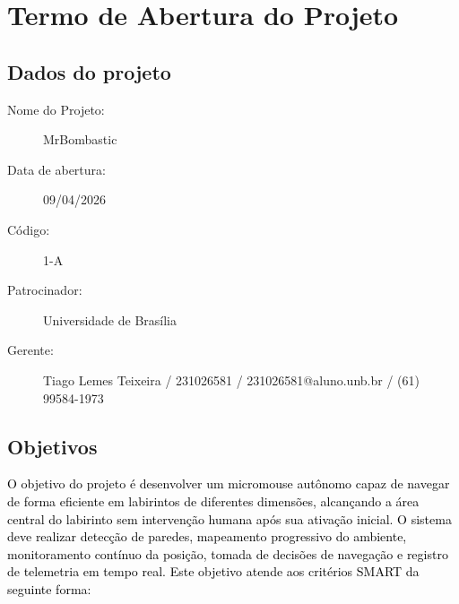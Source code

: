 \chapter{Termo de Abertura do Projeto}

\section{Dados do projeto}
\begin{description}
    \item [Nome do Projeto:] MrBombastic
    \item [Data de abertura:] 09/04/2026
    \item [Código:] 1-A
    \item [Patrocinador:] Universidade de Brasília
    \item [Gerente:] Tiago Lemes Teixeira / 231026581 / 231026581@aluno.unb.br / (61) 99584-1973
\end{description}

\section{Objetivos}

\textcolor{black}{
O objetivo do projeto é desenvolver um micromouse autônomo capaz de navegar de forma eficiente em labirintos de diferentes dimensões, alcançando a área central do labirinto sem intervenção humana após sua ativação inicial. O sistema deve realizar detecção de paredes, mapeamento progressivo do ambiente, monitoramento contínuo da posição, tomada de decisões de navegação e registro de telemetria em tempo real. Este objetivo atende aos critérios SMART da seguinte forma:
}


